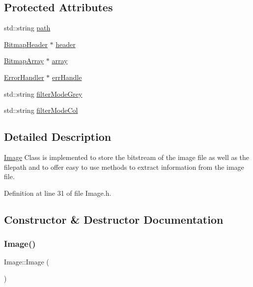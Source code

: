 \subsection*{Protected Attributes}
\begin{DoxyCompactItemize}
\item 
std\+::string \mbox{\hyperlink{classImage_aec8a33f176362d146da8c058798ebbff}{path}}
\item 
\mbox{\hyperlink{classBitmapHeader}{Bitmap\+Header}} $\ast$ \mbox{\hyperlink{classImage_adaf72c2df8979eafb4031dc0384dc49f}{header}}
\item 
\mbox{\hyperlink{classBitmapArray}{Bitmap\+Array}} $\ast$ \mbox{\hyperlink{classImage_a1c18dd7d9eda416d44e7eb408d5b3c38}{array}}
\item 
\mbox{\hyperlink{classErrorHandler}{Error\+Handler}} $\ast$ \mbox{\hyperlink{classImage_a560753c20e67a544be57bba971021375}{err\+Handle}}
\item 
std\+::string \mbox{\hyperlink{classImage_aa05610d5ebee3b0fce0463d2a0b1323f}{filter\+Mode\+Grey}}
\item 
std\+::string \mbox{\hyperlink{classImage_a0b4e4d5994ff72c9f3c99913037c627f}{filter\+Mode\+Col}}
\end{DoxyCompactItemize}


\subsection{Detailed Description}
\mbox{\hyperlink{classImage}{Image}} Class is implemented to store the bitstream of the image file as well as the filepath and to offer easy to use methods to extract information from the image file. 

Definition at line 31 of file Image.\+h.



\subsection{Constructor \& Destructor Documentation}
\mbox{\label{classImage_a58edd1c45b4faeb5f789b0d036d02313}} 
\subsubsection{\texorpdfstring{Image()}{Image()}\hspace{0.1cm}{\footnotesize\ttfamily [1/3]}}
{\footnotesize\ttfamily Image\+::\+Image (\begin{DoxyParamCaption}{ }\end{DoxyParamCaption})}



